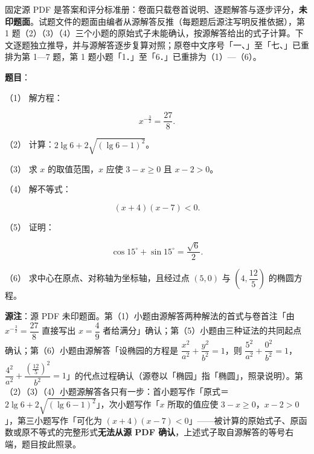 

\begin{gktip}
固定源 PDF 是答案和评分标准册：卷面只载卷首说明、逐题解答与逐步评分，\textbf{未印题面}。试题文件的题面由编者从源解答反推（每题题后源注写明反推依据），第 1 题（2）（3）（4）三个小题的原始式子未能确认，按源解答给出的式子计算。下文逐题独立推导，并与源解答逐步复算对照；原卷中文序号「一、」至「七、」已重排为第 1—7 题，第 1 题小题「1．」至「6．」已重排为（1）—（6）。
\end{gktip}

\begin{answer}

\textbf{题目}：

（1） 解方程：

\nopagebreak[4]
\[
x^{-\frac{3}{2}}=\frac{27}{8}.
\]

（2） 计算：$2\lg6+2\sqrt{(\lg6-1)^2}$。

（3） 求 $x$ 的取值范围，$x$ 应使 $3-x\ge0$ 且 $x-2>0$。

（4） 解不等式：

\nopagebreak[4]
\[
(x+4)(x-7)<0.
\]

（5） 证明：

\nopagebreak[4]
\[
\cos15^\circ+\sin15^\circ=\frac{\sqrt6}{2}.
\]

（6） 求中心在原点、对称轴为坐标轴，且经过点 $(5,0)$ 与 $\left(4,\dfrac{12}{5}\right)$ 的椭圆方程。

\begin{gktip}
\textbf{源注}：源 PDF 未印题面。第（1）小题由源解答两种解法的首式与卷首注「由 $x^{-\frac32}=\dfrac{27}{8}$ 直接写出 $x=\dfrac49$ 者给满分」确认；第（5）小题由三种证法的共同起点确认；第（6）小题由源解答「设椭园的方程是 $\dfrac{x^2}{a^2}+\dfrac{y^2}{b^2}=1$，则 $\dfrac{5^2}{a^2}+\dfrac{0^2}{b^2}=1$，$\dfrac{4^2}{a^2}+\dfrac{\left(\frac{12}{5}\right)^2}{b^2}=1$」的代点过程确认（源卷以「椭园」指「椭圆」，照录说明）。第（2）（3）（4）小题源解答各只有一步：首小题写作「原式＝$2\lg6+2\sqrt{(\lg6-1)^2}$」，次小题写作「$x$ 所取的值应使 $3-x\ge0$，$x-2>0$」，第三小题写作「可化为 $(x+4)(x-7)<0$」——被计算的原始式子、原函数或原不等式的完整形式\textbf{无法从源 PDF 确认}，上述式子取自源解答的等号右端，题目按此照录。
\end{gktip}


\end{answer}
